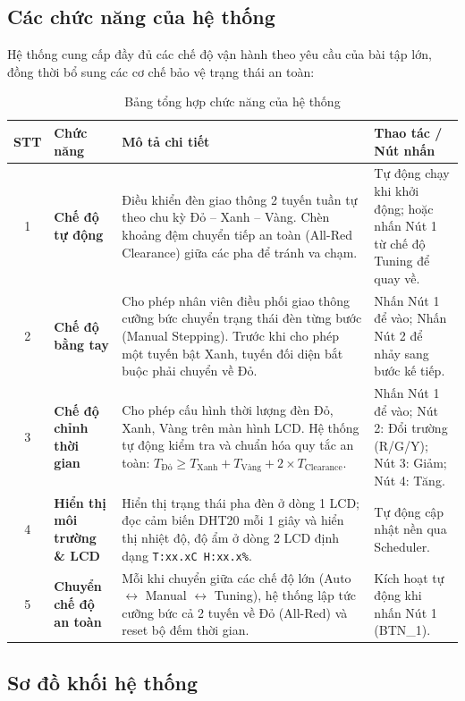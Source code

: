 \subsection{Các chức năng của hệ thống}
Hệ thống cung cấp đầy đủ các chế độ vận hành theo yêu cầu của bài tập lớn, đồng thời bổ sung các cơ chế bảo vệ trạng thái an toàn:

\begin{table}[!htbp]
\centering
\footnotesize
\setlength{\tabcolsep}{4pt}
\renewcommand{\arraystretch}{1.3}
\begin{tabularx}{\textwidth}{|c|>{\raggedright\arraybackslash}p{2.3cm}|X|>{\raggedright\arraybackslash}p{3.1cm}|}
\hline
\textbf{STT} & \textbf{Chức năng} & \textbf{Mô tả chi tiết} & \textbf{Thao tác / Nút nhấn} \\ \hline
1 & \textbf{Chế độ tự động} & Điều khiển đèn giao thông 2 tuyến tuần tự theo chu kỳ Đỏ -- Xanh -- Vàng. Chèn khoảng đệm chuyển tiếp an toàn (All-Red Clearance) giữa các pha để tránh va chạm. & Tự động chạy khi khởi động; hoặc nhấn Nút 1 từ chế độ Tuning để quay về. \\ \hline
2 & \textbf{Chế độ bằng tay} & Cho phép nhân viên điều phối giao thông cưỡng bức chuyển trạng thái đèn từng bước (Manual Stepping). Trước khi cho phép một tuyến bật Xanh, tuyến đối diện bắt buộc phải chuyển về Đỏ. & Nhấn Nút 1 để vào; Nhấn Nút 2 để nhảy sang bước kế tiếp. \\ \hline
3 & \textbf{Chế độ chỉnh thời gian} & Cho phép cấu hình thời lượng đèn Đỏ, Xanh, Vàng trên màn hình LCD. Hệ thống tự động kiểm tra và chuẩn hóa quy tắc an toàn: \newline $T_{\text{Đỏ}} \ge T_{\text{Xanh}} + T_{\text{Vàng}} + 2 \times T_{\text{Clearance}}$. & Nhấn Nút 1 để vào; Nút 2: Đổi trường (R/G/Y); Nút 3: Giảm; Nút 4: Tăng. \\ \hline
4 & \textbf{Hiển thị môi trường \& LCD} & Hiển thị trạng thái pha đèn ở dòng 1 LCD; đọc cảm biến DHT20 mỗi 1 giây và hiển thị nhiệt độ, độ ẩm ở dòng 2 LCD định dạng \texttt{T:xx.xC H:xx.x\%}. & Tự động cập nhật nền qua Scheduler. \\ \hline
5 & \textbf{Chuyển chế độ an toàn} & Mỗi khi chuyển giữa các chế độ lớn (Auto $\leftrightarrow$ Manual $\leftrightarrow$ Tuning), hệ thống lập tức cưỡng bức cả 2 tuyến về Đỏ (All-Red) và reset bộ đếm thời gian. & Kích hoạt tự động khi nhấn Nút 1 (BTN\_1). \\ \hline
\end{tabularx}
\caption{Bảng tổng hợp chức năng của hệ thống}
\label{tab:system_features}
\end{table}



\subsection{Sơ đồ khối hệ thống}
